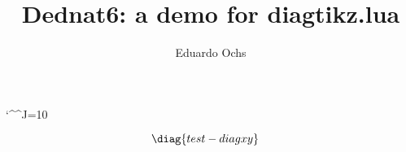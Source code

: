 \documentclass[oneside]{article}
\begin{document}
  \catcode`\^^J=10                      %

\title{Dednat6: a demo for diagtikz.lua}
\author{Eduardo Ochs}
\maketitle

\def\defdiagtikz#1#2{\expandafter\def\csname diagtikz-#1\endcsname{#2}}
\def\ifdiagtikzundefined#1{\expandafter\ifx\csname diagtikz-#1\endcsname\relax}
\def\diagtikz#1{\ifdiagtikzundefined{#1}
    \errmessage{UNDEFINED DIAGTIKZ: #1}
  \else
    \csname diagtikz-#1\endcsname
  \fi
}

%

\pu

$$\diag{test-diagxy}
  \quad
  \diagtikz{test-tikz}
$$
\end{document}
